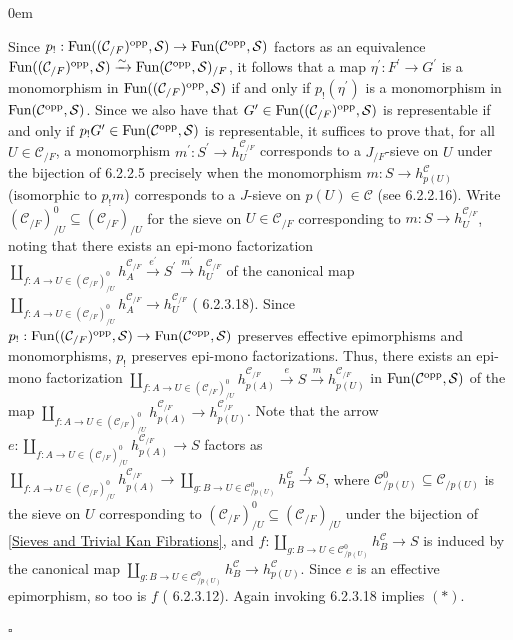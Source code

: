 \documentclass[10pt]{article}
\newcommand{\mS}{\mathcal S}
\newcommand{\C}{\mathcal C}
\renewcommand{\qed}{\hfill$\square$}
\renewenvironment{proof}{\begin{addmargin}[1em]{0em}\begin{newproof}}{\end{newproof}\end{addmargin}\qed}
\theoremstyle{witharg}
\theoremstyle{witharg}
\theoremstyle{witharg2}
\begin{document}
\begin{proof}
\noindent Since $p_!:\textnormal{Fun}((\C_{/F})^{\textnormal{opp}},\mS)\rightarrow \textnormal{Fun}(\C^{\textnormal{opp}},\mS)$ factors as an equivalence $\textnormal{Fun}((\C_{/F})^{\textnormal{opp}},\mS)\xrightarrow{\sim}\textnormal{Fun}(\C^{\textnormal{opp}},\mS)_{/F}$, it follows that a map $\eta^\prime:F^\prime\rightarrow G^\prime$ is a monomorphism in $\textnormal{Fun}((\C_{/F})^{\textnormal{opp}},\mS)$ if and only if $p_!(\eta^\prime)$ is a monomorphism in $\textnormal{Fun}(\C^{\textnormal{opp}},\mS)$. Since we also have that $G^\prime\in \textnormal{Fun}((\C_{/F})^{\textnormal{opp}},\mS)$ is representable if and only if $p_!G^\prime\in \textnormal{Fun}(\C^{\textnormal{opp}},\mS)$ is representable, it suffices to prove that, for all $U\in \C_{/F}$, a monomorphism $m^\prime:S^\prime\rightarrow h^{\C_{/F}}_U$ corresponds to a $J_{/F}$-sieve on $U$ under the bijection of  6.2.2.5 precisely when the monomorphism $m:S\rightarrow h^{\C}_{p(U)}$ (isomorphic to $p_!m$) corresponds to a $J$-sieve on $p(U)\in \C$ (see  6.2.2.16). Write $(\C_{/F})^0_{/U}\subseteq (\C_{/F})_{/U}$ for the sieve on $U\in \C_{/F}$ corresponding to $m:S\rightarrow h^{\C_{/F}}_U$, noting that there exists an epi-mono factorization $\coprod_{f:A\rightarrow U\in (\C_{/F})_{/U}^0}h^{\C_{/F}}_A\xrightarrow{e^\prime} S^\prime\xrightarrow{m^\prime}h^{\C_{/F}}_U$ of the canonical map $\coprod_{f:A\rightarrow U\in (\C_{/F})_{/U}^0}h^{\C_{/F}}_A\rightarrow h^{\C_{/F}}_U$ ( 6.2.3.18). Since $p_!:\textnormal{Fun}((\C_{/F})^{\textnormal{opp}},\mS)\rightarrow \textnormal{Fun}(\C^{\textnormal{opp}},\mS)$ preserves effective epimorphisms and monomorphisms, $p_!$ preserves epi-mono factorizations. Thus, there exists an epi-mono factorization $\coprod_{f:A\rightarrow U\in (\C_{/F})_{/U}^0}h^{\C_{/F}}_{p(A)}\xrightarrow{e}S\xrightarrow{m} h^{\C_{/F}}_{p(U)}$ in $\textnormal{Fun}(\C^{\textnormal{opp}},\mS)$ of the map $\coprod_{f:A\rightarrow U\in (\C_{/F})_{/U}^0}h^{\C_{/F}}_{p(A)}\rightarrow h^{\C_{/F}}_{p(U)}$. Note that the arrow $e:\coprod_{f:A\rightarrow U\in (\C_{/F})_{/U}^0}h^{\C_{/F}}_{p(A)}\rightarrow S$ factors as $\coprod_{f:A\rightarrow U\in (\C_{/F})_{/U}^0}h^{\C_{/F}}_{p(A)}\rightarrow \coprod_{g:B\rightarrow U\in \C^0_{/p(U)}}h^\C_{B}\xrightarrow{f}S$, where $\C^0_{/p(U)}\subseteq \C_{/p(U)}$ is the sieve on $U$ corresponding to $(\C_{/F})_{/U}^0\subseteq (\C_{/F})_{/U}$ under the bijection of \ref{Sieves and Trivial Kan Fibrations}, and $f:\coprod_{g:B\rightarrow U\in \C^0_{/p(U)}}h^\C_{B}\rightarrow S$ is induced by the canonical map $\coprod_{g:B\rightarrow U\in \C^0_{/p(U)}}h^\C_{B}\rightarrow h^\C_{p(U)}$. Since $e$ is an effective epimorphism, so too is $f$ ( 6.2.3.12). Again invoking  6.2.3.18 implies $(*)$.


\end{proof}
\end{document}
